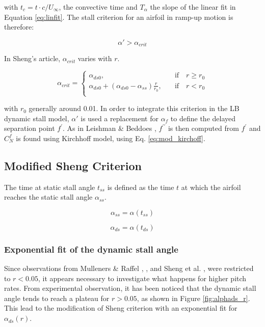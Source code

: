 \noindent with $t_c=t \cdot c/U_{\infty}$, the convective time and $T_\alpha$ the slope of the linear fit in Equation \ref{eq:linfit}. The stall criterion for an airfoil in ramp-up motion is therefore: 

\begin{equation}
\alpha' > \alpha_{crit}
\label{eq:stall_criterion}
\end{equation}

In Sheng's article, $\alpha_{crit}$ varies with $r$. 

\begin{equation}
\alpha_{crit} =
\begin{cases}
\alpha_{ds0}, &\quad \text{if} \quad r \geq r_0 \\
\alpha_{ds0} + (\alpha_{ds0}-\alpha_{ss}) \frac{r}{r_0}, &\quad \text{if} \quad r < r_0 \\
\end{cases}
\end{equation}

\noindent with $r_0$ generally around 0.01. In order to integrate this criterion in the LB dynamic stall model, $\alpha'$ is used a replacement for $\alpha_f$ to define the delayed separation point $f^{\prime}$. As in Leishman \& Beddoes \cite{leishman_semi-empirical_1989}, $f^{\prime \prime}$ is then computed from $f^{\prime}$ and $C_N^f$ is found using Kirchhoff model, using Eq. \eqref{eq:mod_kirchoff}. 

\subsection{Modified Sheng Criterion}

The time at static stall angle $t_{ss}$ is defined as the time $t$ at which the airfoil reaches the static stall angle $\alpha_{ss}$.

\begin{equation}
\alpha_{ss} = \alpha(t_{ss})
\end{equation}

\begin{equation}
	\alpha_{ds} = \alpha(t_{ds})
\end{equation}

\subsubsection{Exponential fit of the dynamic stall angle}

Since observations from Mulleners \& Raffel \cite{mulleners_onset_2010}, \cite{mulleners_onset_2012}, \cite{mulleners_dynamic_2013} and Sheng et al. \cite{sheng_new_2006}, \cite{} were restricted to $r<0.05$, it appears necessary to investigate what happens for higher pitch rates. From experimental observation, it has been noticed that the dynamic stall angle tends to reach a plateau for $r>0.05$, as shown in Figure  \ref{fig:alphads_r}. This lead to the modification of Sheng criterion with an exponential fit for $\alpha_{ds}(r)$. 

